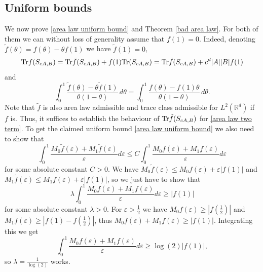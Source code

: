 \documentclass[12pt]{amsart}
\numberwithin{equation}{section}
\newcommand{\R}{\mathbb{R}}
\newcommand{\eps}{\varepsilon}
\begin{document}
\subsection{Uniform bounds}
We now prove \eqref{area law uniform bound} and Theorem \ref{bad area law}. For both of them we can without loss of generality assume that $f(1) = 0$. Indeed, denoting $\tilde{f}(\theta) = f(\theta) - \theta f(1)$ we have $\tilde{f}(1) = 0$, $${\rm Tr}f(S_{cA,B}) = {\rm Tr}\tilde{f}(S_{cA,B}) + f(1){\rm Tr}(S_{cA,B}) ={\rm Tr}\tilde{f}(S_{cA,B}) +c^d|A||B|f(1)$$ 
and 
\[
\int_0^1 \frac{\tilde{f}(\theta) - \theta\tilde{f}(1)}{\theta(1-\theta)} \, d\theta = \int_0^1 \frac{f(\theta) - f(1)\theta}{\theta(1-\theta)} \, d\theta.
\]
Note that $\tilde{f}$ is also area law admissible and trace class admissible for $L^2(\R^d)$ if $f$ is. Thus, it suffices to establish the behaviour of ${\rm Tr}\tilde{f}(S_{cA,B})$ for \eqref{area law two term}. To get the claimed uniform bound \eqref{area law uniform bound} we also need to show that $$ \int_0^1 \frac{M_0\tilde{f}(\eps) + M_1\tilde{f}(\eps)}{\eps}d\eps \leq C\int_0^1 \frac{M_0f(\eps) + M_1f(\eps)}{\eps}d\eps$$ for some absolute constant $C > 0$. We have $M_0 \tilde{f}(\eps) \le M_0 f(\eps) + \eps|f(1)|$ and $M_1\tilde{f}(\eps) \le M_1 f(\eps) + \eps |f(1)|$, so we just have to show that $$\lambda\int_0^1 \frac{M_0f(\eps) + M_1f(\eps)}{\eps}d\eps \ge |f(1)|$$ for some absolute constant $\lambda > 0$. For $\eps > \frac{1}{2}$ we have $M_0f(\eps) \ge |f(\frac{1}{2})|$ and $M_1f(\eps) \ge |f(1) - f(\frac{1}{2})|$, thus $M_0f(\eps) +M_1f(\eps)\ge |f(1)|$. Integrating this we get
$$\int_0^1\frac{M_0f(\eps) + M_1f(\eps)}{\eps}d\eps \ge \log(2)|f(1)|,$$
so $\lambda = \frac{1}{\log(2)}$ works.
\end{document}
